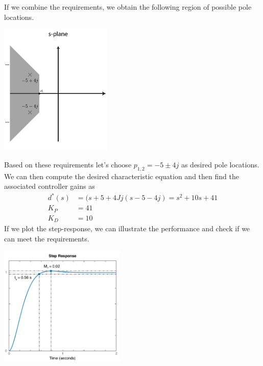 \documentclass[twoside]{article}
\begin{document}
  If we combine the requirements, we obtain the following region of possible pole locations.
  
     \begin{minipage}[h]{1\linewidth}
    \begin{center}
     \includegraphics[width=0.4\textwidth]{result}
    \end{center}
  \end{minipage}
  
  Based on these requirements let's choose $p_{1,2} = -5 \pm 4 j$ as desired pole locations. 
  We can then compute the desired characteristic equation and then find the associated controller
  gains as
  \begin{align*}
  	d^*(s) &= (s + 5 + 4 Jj (s - 5 - 4 j) = s^2 + 10 s + 41
	\\
	K_P &= 41
	\\
	K_D &= 10
  \end{align*}
  If we plot the step-response, we can illustrate the performance and check if we can meet the
  requirements.
  
       \begin{minipage}[h]{1\linewidth}
    \begin{center}
     \includegraphics[width=0.45\textwidth]{stepex}
    \end{center}
  \end{minipage}
  
\end{document}
